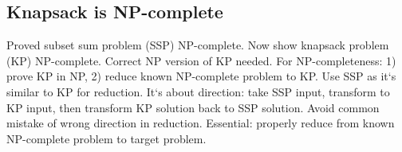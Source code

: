 \subsection*{Knapsack is NP-complete}
Proved subset sum problem (SSP) NP-complete.
Now show knapsack problem (KP) NP-complete.
Correct NP version of KP needed.
For NP-completeness: 1) prove KP in NP, 2) reduce known NP-complete problem to KP\@.
Use SSP as it`s similar to KP for reduction.
It`s about direction: take SSP input, transform to KP input, then transform KP solution back to SSP solution.
Avoid common mistake of wrong direction in reduction.
Essential: properly reduce from known NP-complete problem to target problem.

